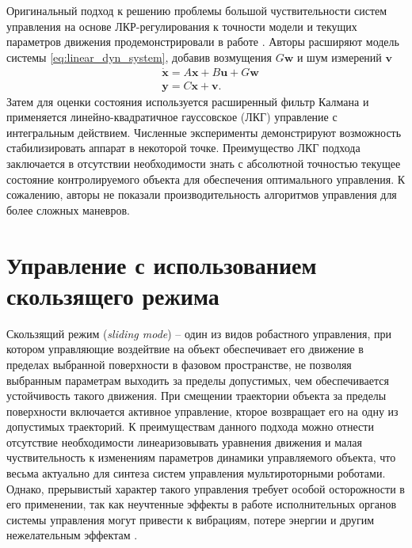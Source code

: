 Оригинальный подход к решению проблемы большой чуствительности систем управления на основе ЛКР-регулирования к точности модели и текущих параметров движения продемонстрировали в работе \cite{Minh01}. Авторы расширяют модель системы \eqref{eq:linear_dyn_system}, добавив возмущения $G \bm{w}$ и шум измерений $\bm{v}$
\begin{equation} \label{eq:linear_dyn_system_noisy}
\begin{aligned}
&\dot{\bm{x}} = A\bm{x} + B\bm{u} + G \bm{w}\\
&\bm{y} = C \bm{x} + \bm{v}.
\end{aligned}
\end{equation}
Затем для оценки состояния используется расширенный фильтр Калмана и применяется линейно-квадратичное гауссовское (ЛКГ) управление с интегральным действием. Численные эксперименты демонстрируют возможность стабилизировать аппарат в некоторой точке. Преимущество ЛКГ подхода заключается в отсутствии необходимости знать с абсолютной точностью текущее состояние контролируемого объекта для обеспечения оптимального управления. К сожалению, авторы не показали производительность алгоритмов управления для более сложных маневров.

\section{Управление с использованием скользящего режима}

Скользящий режим (\textit{sliding mode}) -- один из видов робастного управления, при котором управляющие воздейтвие на объект обеспечивает его движение в пределах выбранной поверхности в фазовом пространстве, не позволяя выбранным параметрам выходить за пределы допустимых, чем обеспечивается устойчивость такого движения. При смещении траектории объекта за пределы поверхности включается активное управление, кторое возвращает его на одну из допустимых траекторий. К преимуществам данного подхода можно отнести отсутствие необходимости линеаризовывать уравнения движения и малая чуствительность к изменениям параметров динамики управляемого объекта, что весьма актуально для синтеза систем управления мультироторными роботами. Однако, прерывистый характер такого управления требует особой осторожности в его применении, так как неучтенные эффекты в работе исполнительных органов системы управления могут привести к вибрациям, потере энергии и другим нежелательным эффектам \cite{Utkin01}.


